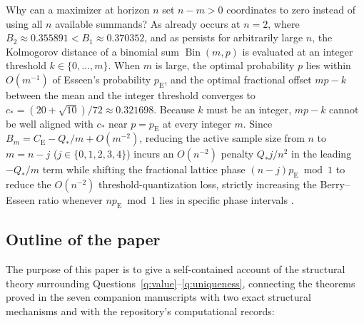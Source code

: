 \documentclass[11pt]{article}
\numberwithin{equation}{section}
\theoremstyle{definition}
\theoremstyle{remark}
\DeclareMathOperator{\Bin}{Bin}
\newcommand{\ce}{C_{\mathrm E}}
\newcommand{\pe}{p_{\mathrm E}}
\begin{document}
Why can a maximizer at horizon $n$ set $n-m>0$ coordinates to zero instead of
using all $n$ available summands? As already occurs at $n=2$, where
$B_2\approx0.355891<B_1\approx0.370352$, and as persists for arbitrarily
large $n$, the Kolmogorov distance of a binomial sum $\Bin(m,p)$ is evaluated
at an integer threshold $k\in\{0,\ldots,m\}$. When $m$ is large, the
optimal probability $p$ lies within $O(m^{-1})$ of Esseen's probability
$\pe$, and the optimal fractional offset $mp-k$ between the mean and the
integer threshold converges to $c_*=(20+\sqrt{10})/72\approx0.321698$.
Because $k$ must be an integer, $mp-k$ cannot be well aligned with $c_*$ near
$p=\pe$ at every integer $m$. Since $B_m=\ce-Q_*/m+O(m^{-2})$, reducing the
active sample size from $n$ to $m=n-j$ ($j\in\{0,1,2,3,4\}$) incurs an
$O(n^{-2})$ penalty $Q_*j/n^2$ in the leading $-Q_*/m$ term while shifting
the fractional lattice phase $(n-j)\pe\bmod1$ to reduce the $O(n^{-2})$
threshold-quantization loss, strictly increasing the Berry--Esseen ratio
whenever $n\pe\bmod1$ lies in specific phase intervals
\citep[Section~4]{BellBernoulli2026}.

\subsection{Outline of the paper}

The purpose of this paper is to give a self-contained account of the
structural theory surrounding Questions~\ref{q:value}--\ref{q:uniqueness},
connecting the theorems proved in the seven companion manuscripts
\citep{BellIndependent2026,BellFinite2026,BellSmall2026,BellTransport2026,BellBernoulli2026,BellSmallStructure2026,BellExtremizers2026}
with two exact structural mechanisms and with the repository's computational
records:
\end{document}
